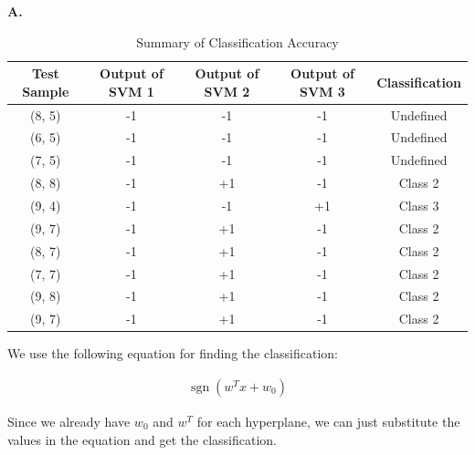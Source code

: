 \documentclass[12pt]{report}
\begin{document}
\textbf{A.}
\begin{table}[H]
	\centering
	\begin{tabular}{| c | c | c | c | c |}
		\hline
		Test Sample & Output of SVM 1 & Output of SVM 2 & Output of SVM 3 & Classification \\ [0.5ex]
		\hline
		(8, 5)      & -1              & -1              & -1              & Undefined      \\
		(6, 5)      & -1              & -1              & -1              & Undefined      \\
		(7, 5)      & -1              & -1              & -1              & Undefined      \\
		(8, 8)      & -1              & +1              & -1              & Class 2        \\
		(9, 4)      & -1              & -1              & +1              & Class 3        \\
		(9, 7)      & -1              & +1              & -1              & Class 2        \\
		(8, 7)      & -1              & +1              & -1              & Class 2        \\
		(7, 7)      & -1              & +1              & -1              & Class 2        \\
		(9, 8)      & -1              & +1              & -1              & Class 2        \\
		(9, 7)      & -1              & +1              & -1              & Class 2        \\
		\hline
	\end{tabular}
	\caption{Summary of Classification Accuracy}
\end{table}

\vspace{20pt}

We use the following equation for finding the classification:

\begin{equation*}
	\begin{aligned}
		\mathop{sgn}(w^T x + w_{0})
	\end{aligned}
\end{equation*}

Since we already have $w_{0}$ and $w^T$ for each hyperplane, we can just substitute the values in the equation and get the classification.
\newline
\end{document}
